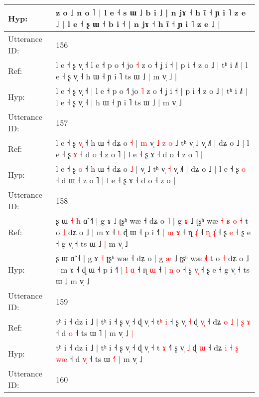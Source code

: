 \documentclass[10pt]{article}
\DeclareRobustCommand{\hl}[1]{{\textcolor{red}{#1}}}
\begin{document}
\begin{longtable}{ll}
 \\
Hyp: & z o ˩ n o ˥ | l e ˧ s ɯ ˩ b i ˩ | n jɤ ˧\hl{}\hl{} h ĩ ˧ ɲ i ˥ z e ˩ | l e ˧ ʂ ɯ ˧ b i ˧ | n jɤ ˧\hl{}\hl{} h ĩ ˧ ɲ i ˥ z e ˩ |
 \\
\midrule
Utterance ID: & 156 \\
Ref: & l e ˧ ʂ v̩ ˧\hl{}\hl{} l e ˧ p o ˧\hl{} jo \hl{˧} z o ˧ ʝ i ˧ | p i ˧ z o ˩ | tʰ i ˩˥ | l e ˧ ʂ v̩ ˧\hl{}\hl{} h ɯ ˧ ɲ i ˥ ts ɯ ˩ | m v̩ ˩\hl{ }\hl{|}
 \\
Hyp: & l e ˧ ʂ v̩ ˧\hl{ }\hl{|} l e ˧ p o ˧\hl{˥} jo \hl{˥} z o ˧ ʝ i ˧ | p i ˧ z o ˩ | tʰ i ˩˥ | l e ˧ ʂ v̩ ˧\hl{ }\hl{|} h ɯ ˧ ɲ i ˥ ts ɯ ˩ | m v̩ ˩\hl{}\hl{}
 \\
\midrule
Utterance ID: & 157 \\
Ref: & l e ˧ ʂ \hl{v}\hl{̩} ˧ h ɯ ˧ dʑ o \hl{˧} |\hl{ }\hl{m} v̩\hl{ }\hl{˩}\hl{ }\hl{z}\hl{ }\hl{o} ˩ tʰ v̩ \hl{˩} v̩ ˩˥ | dʑ o ˩ | l e ˧ ʂ \hl{ɤ} ˧ d \hl{o} ˧ z o ˥ | l e ˧ ʂ ɤ ˧ d o ˧ z o\hl{ }\hl{˥} |
 \\
Hyp: & l e ˧ ʂ \hl{}\hl{o} ˧ h ɯ ˧ dʑ o \hl{˩} |\hl{}\hl{} v̩\hl{}\hl{}\hl{}\hl{}\hl{}\hl{} ˩ tʰ v̩ \hl{˧} v̩ ˩˥ | dʑ o ˩ | l e ˧ ʂ \hl{o} ˧ d \hl{ɯ} ˧ z o ˥ | l e ˧ ʂ ɤ ˧ d o ˧ z o\hl{}\hl{} |
 \\
\midrule
Utterance ID: & 158 \\
Ref: & ʂ ɯ\hl{ }\hl{˧}\hl{ }\hl{h} ɑ̃ ˧\hl{˥} | g ɤ \hl{˩} ʈʂʰ wæ ˧ dʑ o\hl{ }\hl{˥} | g \hl{ɤ} ˩ ʈʂʰ wæ\hl{ }\hl{˧}\hl{ }\hl{ʁ} \hl{o}\hl{ }\hl{˧} t o \hl{˩} dʑ o ˩ | m ɤ ˧\hl{ }\hl{t} ɖ ɯ ˧ p i ˧˥ | \hl{m} \hl{ɤ} ˧ ɳ \hl{ɻ}\hl{̍} ˧ \hl{ɳ} \hl{}\hl{ɻ}\hl{̍} ˧ ʂ \hl{}\hl{e} ˧ ʂ e ˧ g v̩ ˧ ts ɯ ˩\hl{ }\hl{|} m v̩ ˩
 \\
Hyp: & ʂ ɯ\hl{}\hl{}\hl{}\hl{} ɑ̃ ˧\hl{} | g ɤ \hl{˧} ʈʂʰ wæ ˧ dʑ o\hl{}\hl{} | g \hl{æ} ˩ ʈʂʰ wæ\hl{}\hl{}\hl{}\hl{} \hl{}\hl{˩}\hl{˥} t o \hl{˧} dʑ o ˩ | m ɤ ˧\hl{}\hl{} ɖ ɯ ˧ p i ˧˥ | \hl{l} \hl{ɑ} ˧ ɳ \hl{}\hl{ɯ} ˧ \hl{|} \hl{n}\hl{ }\hl{o} ˧ ʂ \hl{v}\hl{̩} ˧ ʂ e ˧ g v̩ ˧ ts ɯ ˩\hl{}\hl{} m v̩ ˩
 \\
\midrule
Utterance ID: & 159 \\
Ref: & tʰ i ˧ dz i ˩ | tʰ i ˧ ʂ v̩ ˧ ɖ v̩ ˧ t\hl{ʰ} \hl{i} ˧\hl{} ʂ v̩ \hl{˧} ɖ \hl{v}\hl{̩} ˧ dʑ \hl{o} \hl{˩} \hl{|} \hl{ʂ}\hl{ }\hl{ɤ} ˧ d \hl{}\hl{o} ˧ ts ɯ \hl{}˥ | m v̩ ˩\hl{ }\hl{|}
 \\
Hyp: & tʰ i ˧ dz i ˩ | tʰ i ˧ ʂ v̩ ˧ ɖ v̩ ˧ t\hl{} \hl{ɤ} ˧\hl{˥} ʂ v̩ \hl{˩} ɖ \hl{}\hl{ɯ} ˧ dʑ \hl{i} \hl{˧} \hl{ʂ} \hl{}\hl{w}\hl{æ} ˧ d \hl{v}\hl{̩} ˧ ts ɯ \hl{˧}˥ | m v̩ ˩\hl{}\hl{}
 \\
\midrule
Utterance ID: & 160 \\

\end{longtable}
\end{document}
